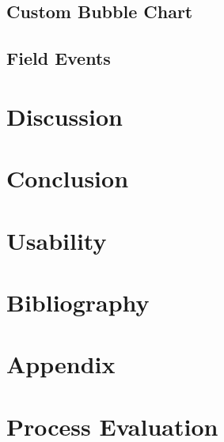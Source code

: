 \documentclass[a4paper,11pt]{article}
\begin{document}
\subsection{Custom Bubble Chart}

\subsection{Field Events}

\section{Discussion}

\section{Conclusion}

\section{Usability}

\section{Bibliography}



\section{Appendix}

\section{Process Evaluation}
\end{document}
